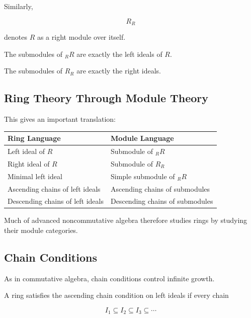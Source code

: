 Similarly,

\[ R_R \]

denotes \(R\) as a right module over itself.

The submodules of \({}_RR\) are exactly the left ideals of \(R\).

The submodules of \(R_R\) are exactly the right ideals.

\subsection{Ring Theory Through Module Theory}
\label{subsec:ring-through-module-theory}

This gives an important translation:

\begin{center}
\begin{tabularx}{0.88\textwidth}{@{}XX@{}}
\toprule
\textbf{Ring Language} & \textbf{Module Language}\\
\midrule
Left ideal of \(R\) & Submodule of \({}_RR\)\\
Right ideal of \(R\) & Submodule of \(R_R\)\\
Minimal left ideal & Simple submodule of \({}_RR\)\\
Ascending chains of left ideals & Ascending chains of submodules\\
Descending chains of left ideals & Descending chains of submodules\\
\bottomrule
\end{tabularx}
\end{center}

Much of advanced noncommutative algebra therefore studies rings by studying
their module categories.

\subsection{Chain Conditions}
\label{subsec:noncommutative-chain-conditions}

As in commutative algebra, chain conditions control infinite growth.

A ring satisfies the ascending chain condition on left ideals if every chain

\[ I_1\subseteq I_2\subseteq I_3\subseteq\cdots \]

